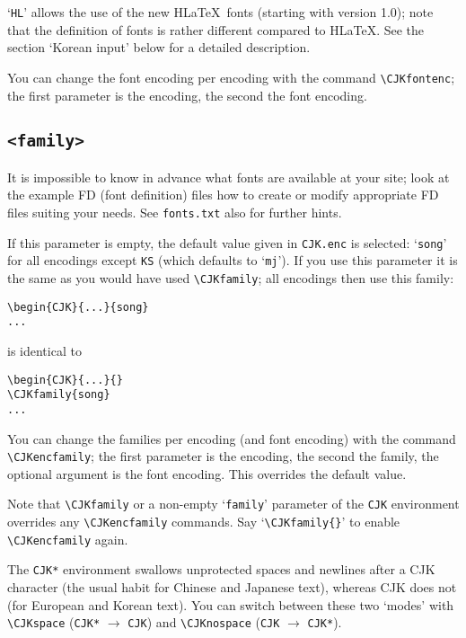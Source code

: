 \documentclass[a4paper, 11pt, draft]{article}
\begin{document}
`\texttt{HL}' allows the use of the new H\LaTeX\ fonts (starting
with version 1.0); note that the definition of fonts is
rather different compared to H\LaTeX. See the section
`Korean input' below for a detailed description.

You can change the font encoding per encoding with the
command \verb+\CJKfontenc+; the first parameter is the
encoding, the second the font encoding.


\subsection{\texttt{<family>}}

It is impossible to know in advance what fonts are
available at your site; look at the example FD (font
definition) files how to create or modify appropriate FD
files suiting your needs. See \texttt{fonts.txt} also for further
hints.

If this parameter is empty, the default value given in
\texttt{CJK.enc} is selected: `\texttt{song}' for all encodings except \texttt{KS}
(which defaults to `\texttt{mj}'). If you use this parameter it
is the same as you would have used \verb+\CJKfamily+; all
encodings then use this family:
%
\begin{verbatim}
\begin{CJK}{...}{song}
...
\end{verbatim}
%
is identical to
%
\begin{verbatim}
\begin{CJK}{...}{}
\CJKfamily{song}
...
\end{verbatim}

You can change the families per encoding (and font
encoding) with the command \verb+\CJKencfamily+; the first
parameter is the encoding, the second the family, the
optional argument is the font encoding. This overrides
the default value.

Note that \verb+\CJKfamily+ or a non-empty `\texttt{family}' parameter
of the \texttt{CJK} environment overrides any \verb+\CJKencfamily+
commands. Say `\verb+\CJKfamily{}+' to enable \verb+\CJKencfamily+
again.

The \texttt{CJK*} environment swallows unprotected spaces and newlines after a
CJK character (the usual habit for Chinese and Japanese text), whereas
CJK does not (for European and Korean text). You can switch between
these two `modes' with \verb+\CJKspace+ (\texttt{CJK*} $\to$ \texttt{CJK}) and \verb+\CJKnospace+ (\texttt{CJK} $\to$
\texttt{CJK*}).
\end{document}
